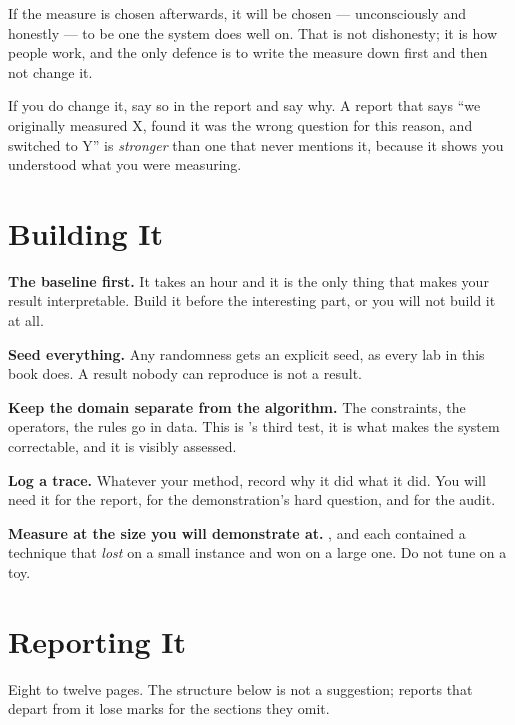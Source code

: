 \begin{alertbox}
If the measure is chosen afterwards, it will be chosen --- unconsciously and
honestly --- to be one the system does well on. That is not dishonesty; it is how
people work, and the only defence is to write the measure down first and then not
change it.

If you do change it, say so in the report and say why. A report that says ``we
originally measured X, found it was the wrong question for this reason, and switched
to Y'' is \emph{stronger} than one that never mentions it, because it shows you
understood what you were measuring.
\end{alertbox}

\section{Building It}

\begin{tight}
  \item \textbf{The baseline first.} It takes an hour and it is the only thing that
        makes your result interpretable. Build it before the interesting part, or
        you will not build it at all.
  \item \textbf{Seed everything.} Any randomness gets an explicit seed, as every lab
        in this book does. A result nobody can reproduce is not a result.
  \item \textbf{Keep the domain separate from the algorithm.} The constraints, the
        operators, the rules go in data. This is 's third test,
        it is what makes the system correctable, and it is visibly assessed.
  \item \textbf{Log a trace.} Whatever your method, record why it did what it did.
        You will need it for the report, for the demonstration's hard question, and
        for the audit.
  \item \textbf{Measure at the size you will demonstrate at.} ,
         and  each contained a technique that
        \emph{lost} on a small instance and won on a large one. Do not tune on a toy.
\end{tight}

\section{Reporting It}

Eight to twelve pages. The structure below is not a suggestion; reports that depart
from it lose marks for the sections they omit.

